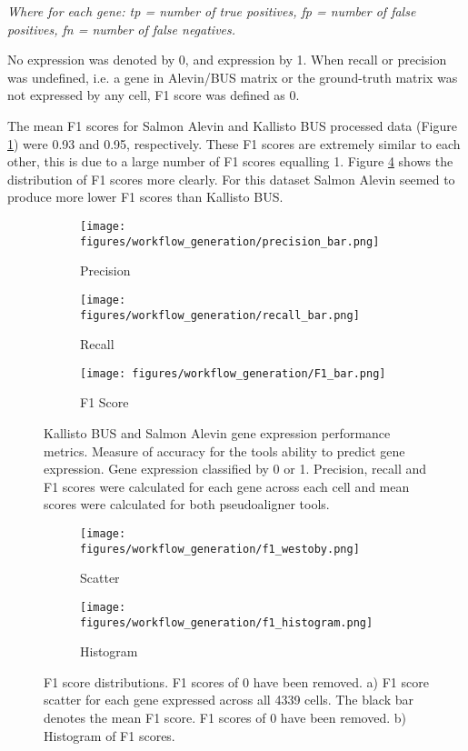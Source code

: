 \textit{Where for each gene: tp = number of true positives, fp = number of false positives, fn = number of false negatives.}


No expression was denoted by 0, and expression by 1.
When recall or precision was undefined, i.e. a gene in Alevin/BUS matrix or the ground-truth matrix was not expressed by any cell, F1 score was defined as 0.

The mean F1 scores for Salmon Alevin and Kallisto BUS processed data (Figure \ref{fig:precision_recall_f1_bar}) were 0.93 and 0.95, respectively.
These F1 scores are extremely similar to each other, this is due to a large number of F1 scores equalling 1.
Figure \ref{fig:westoby_histogram} shows the distribution of F1 scores more clearly.
For this dataset Salmon Alevin seemed to produce more lower F1 scores than Kallisto BUS\@.

\begin{figure}[h]
\centering
\begin{subfigure}{0.32\textwidth}
    \texttt{[image: figures/workflow\_generation/precision\_bar.png]}
    \caption{Precision}
\end{subfigure}
\begin{subfigure}{0.32\textwidth}
    \texttt{[image: figures/workflow\_generation/recall\_bar.png]}
    \caption{Recall}
\end{subfigure}
\begin{subfigure}{0.32\textwidth}
    \centering
    \texttt{[image: figures/workflow\_generation/F1\_bar.png]}
    \caption{F1 Score}
\end{subfigure}
\caption[Kallisto BUS and Salmon Alevin gene expression prediction performance]{Kallisto BUS and Salmon Alevin gene expression performance metrics.
Measure of accuracy for the tools ability to predict gene expression.
Gene expression classified by 0 or 1.
Precision, recall and F1 scores were calculated for each gene across each cell and mean scores were calculated for both pseudoaligner tools.}
\label{fig:precision_recall_f1_bar}
\end{figure}
%
\begin{figure}[h]
\begin{subfigure}{0.5\textwidth}
    \texttt{[image: figures/workflow\_generation/f1\_westoby.png]}
    \caption{Scatter}
    \label{fig:f1_westoby}
\end{subfigure}
\begin{subfigure}{0.5\textwidth}
    \texttt{[image: figures/workflow\_generation/f1\_histogram.png]}
    \caption{Histogram}
    \label{fig:f1_hist}
\end{subfigure}
\caption[F1 score distribution]{F1 score distributions.
    F1 scores of 0 have been removed.
    a) F1 score scatter for each gene expressed across all 4339 cells.
    The black bar denotes the mean F1 score.
    F1 scores of 0 have been removed.
    b) Histogram of F1 scores.}
\label{fig:westoby_histogram}
\end{figure}

